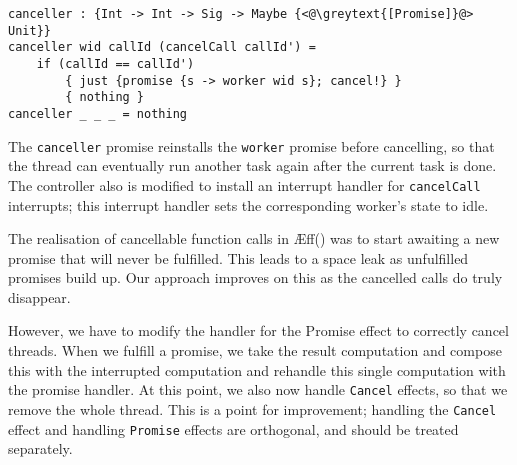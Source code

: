 \documentclass[msc,deptreport,cs]{infthesis} %
\newcommand{\code}[1]{\lstinline{#1}}
\newcommand{\texthighlight}[1]{%
  \colorbox{red!20}{#1}}
\newcommand{\greytext}[1]{\textcolor{black!40}{#1}}
\newcommand\aeff{{\AE}ff\xspace}
\newcommand{\todo}[1]
           {{\par\noindent\small\color{RoyalPurple}
  \framebox{\parbox{\dimexpr\linewidth-2\fboxsep-2\fboxrule}
    {\textbf{TODO:} #1}}}}
\begin{document}

\begin{lstlisting}
canceller : {Int -> Int -> Sig -> Maybe {<@\greytext{[Promise]}@> Unit}}
canceller wid callId (cancelCall callId') =
    if (callId == callId')
        { just {promise {s -> worker wid s}; cancel!} }
        { nothing }
canceller _ _ _ = nothing
\end{lstlisting}


\noindent The \code{canceller} promise reinstalls the \code{worker} promise
before cancelling, so that the thread can eventually run another task again
after the current task is done. The controller also is modified to install an
interrupt handler for \code{cancelCall} interrupts; this interrupt handler sets
the corresponding worker's state to idle.


The realisation of cancellable function calls in
\aeff(\cite{ahman2020asynchronous}) was to start awaiting a new promise that
will never be fulfilled. This leads to a space leak as unfulfilled promises
build up. Our approach improves on this as the cancelled calls do truly
disappear.


However, we have to modify the handler for the \textsf{Promise} effect to
correctly cancel threads. When we fulfill a promise, we take the result
computation and compose this with the interrupted computation and rehandle this
single computation with the promise handler. At this point, we also now handle
\code{Cancel} effects, so that we remove the whole thread. This is a point for
improvement; handling the \code{Cancel} effect and handling \code{Promise}
effects are orthogonal, and should be treated separately.
\end{document}
